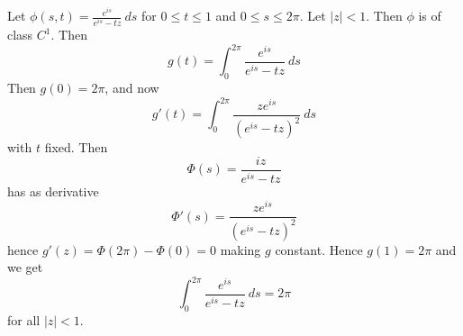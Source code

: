 \begin{example}\label{example_4.2}
    Let $\phi(s,t)=\frac{e^{is}}{e^{is}-tz} \ ds$ for $0 \leq t \leq 1$ and  $0
    \leq s \leq 2\pi$. Let  $|z|<1$. Then  $\phi$ is of class $C^1$. Then
    \begin{equation*}
        g(t)=\int_0^{2\pi}{\frac{e^{is}}{e^{is}-tz} \ ds}
    \end{equation*}
    Then $g(0)=2\pi$, and now
    \begin{equation*}
        g'(t)=\int_0^{2\pi}{\frac{ze^{is}}{(e^{is}-tz)^2} \ ds}
    \end{equation*}
    with $t$ fixed. Then
    \begin{equation*}
        \Phi(s)=\frac{iz}{e^{is}-tz}
    \end{equation*}
    has as derivative
    \begin{equation*}
        \Phi'(s)=\frac{ze^{is}}{(e^{is}-tz)^2}
    \end{equation*}
    hence $g'(z)=\Phi(2\pi)-\Phi(0)=0$ making $g$ constant. Hence  $g(1)=2\pi$
    and we get
    \begin{equation*}
        \int_0^{2\pi}{\frac{e^{is}}{e^{is}-tz} \ ds}=2\pi
    \end{equation*}
    for all $|z|<1$.
\end{example}

